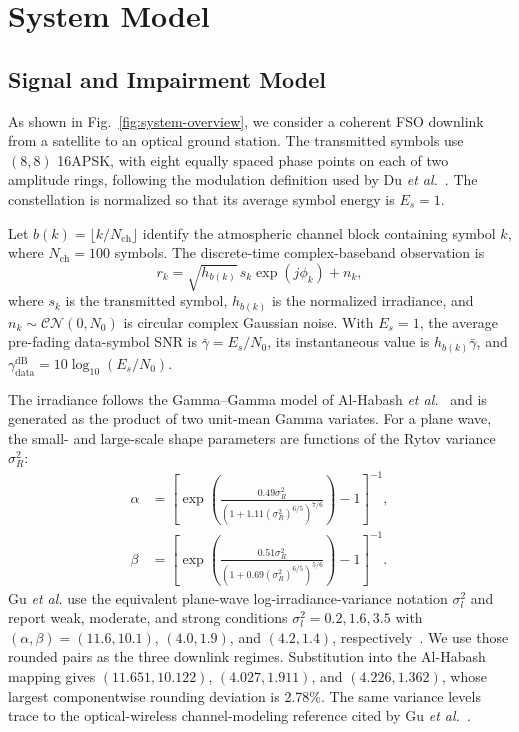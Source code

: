 \section{System Model}

\subsection{Signal and Impairment Model}

As shown in Fig.~\ref{fig:system-overview}, we consider a coherent FSO downlink from a satellite to an optical ground station. The transmitted symbols use \((8,8)\) 16APSK, with eight equally spaced phase points on each of two amplitude rings, following the modulation definition used by Du \emph{et al.}~\cite{du2025nda}. The constellation is normalized so that its average symbol energy is \(E_s=1\).

Let \(b(k)=\lfloor k/N_{\mathrm{ch}}\rfloor\) identify the atmospheric channel block containing symbol \(k\), where \(N_{\mathrm{ch}}=100\) symbols. The discrete-time complex-baseband observation is
\begin{equation}
  r_k = \sqrt{h_{b(k)}}\,s_k\exp\!\left(j\phi_k\right)+n_k,
  \label{eq:received-signal}
\end{equation}
where \(s_k\) is the transmitted symbol, \(h_{b(k)}\) is the normalized irradiance, and \(n_k\sim\mathcal{CN}(0,N_0)\) is circular complex Gaussian noise. With \(E_s=1\), the average pre-fading data-symbol SNR is \(\bar{\gamma}=E_s/N_0\), its instantaneous value is \(h_{b(k)}\bar{\gamma}\), and \(\gamma_{\mathrm{data}}^{\mathrm{dB}}=10\log_{10}(E_s/N_0)\).

The irradiance follows the Gamma--Gamma model of Al-Habash \emph{et al.}~\cite{alhabash2001} and is generated as the product of two unit-mean Gamma variates. For a plane wave, the small- and large-scale shape parameters are functions of the Rytov variance \(\sigma_R^2\):
\begin{equation}
\begin{aligned}
\alpha&=\left[\exp\!\left(\frac{0.49\sigma_R^2}{(1+1.11(\sigma_R^2)^{6/5})^{7/6}}\right)-1\right]^{-1},\\
\beta&=\left[\exp\!\left(\frac{0.51\sigma_R^2}{(1+0.69(\sigma_R^2)^{6/5})^{5/6}}\right)-1\right]^{-1}.
\end{aligned}
\label{eq:gg-shape-mapping}
\end{equation}
Gu \emph{et al.} use the equivalent plane-wave log-irradiance-variance notation \(\sigma_l^2\) and report weak, moderate, and strong conditions \(\sigma_l^2=0.2,1.6,3.5\) with \((\alpha,\beta)=(11.6,10.1)\), \((4.0,1.9)\), and \((4.2,1.4)\), respectively~\cite{gu2022mfi}. We use those rounded pairs as the three downlink regimes. Substitution into the Al-Habash mapping gives \((11.651,10.122)\), \((4.027,1.911)\), and \((4.226,1.362)\), whose largest componentwise rounding deviation is 2.78\%. The same variance levels trace to the optical-wireless channel-modeling reference cited by Gu \emph{et al.}~\cite{ghassemlooy2019owc}.

